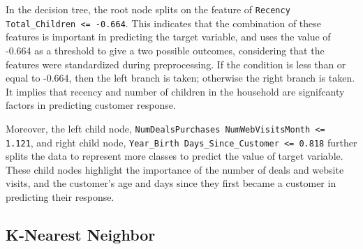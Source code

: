 In the decision tree, the root node splits on the feature of \texttt{Recency Total\_Children <= -0.664}. This indicates that the combination of these features is important in predicting the target variable, and uses the value of -0.664 as a threshold to give a two possible outcomes, considering that the features were standardized during preprocessing. If the condition is less than or equal to -0.664, then the left branch is taken; otherwise the right branch is taken. It implies that recency and number of children in the household are signifcanty factors in predicting customer response. 

Moreover, the left child node, \texttt{NumDealsPurchases NumWebVisitsMonth <= 1.121}, and right child node, \texttt{Year\_Birth Days\_Since\_Customer <= 0.818} further splits the data to represent more classes to predict the value of target variable. These child nodes highlight the importance of the number of deals and website visits, and the customer's age and days since they first became a customer in predicting their response.

\subsection{K-Nearest Neighbor}
